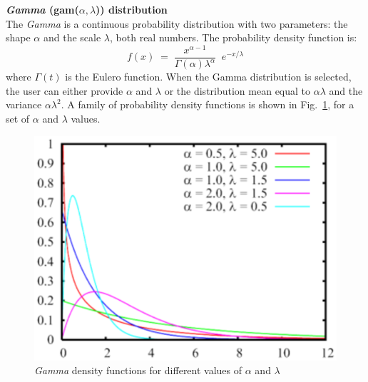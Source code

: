 \textbf{\emph{Gamma} (gam($\alpha,\lambda$)) distribution}\\
The \emph{Gamma} is a continuous probability distribution with two
parameters: the shape $\alpha$ and the scale $\lambda$, both real
numbers. The probability density function is:
\[
f(x)\; = \; \frac{x^{\alpha-1}}{\Gamma(\alpha) \lambda^\alpha} \;
\; e^{- x/\lambda}
\]
where $\Gamma(t)$ is the Eulero function. When the Gamma
distribution is selected, the user can either provide $\alpha$ and
$\lambda$ or the distribution mean equal to $\alpha \lambda$ and
the variance $\alpha \lambda^2$. A family of probability density
functions is shown in Fig.~\ref{fig:famGam}, for a set of $\alpha$
and $\lambda$ values.
\begin{figure}[htb]
    \begin{center}
        \includegraphics[scale=.5]{img/jsimg/4.6.eps}
    \end{center}
    \caption{\emph{Gamma} density functions for different values of $\alpha$ and $\lambda$}
    \label{fig:famGam}
\end{figure}\\

